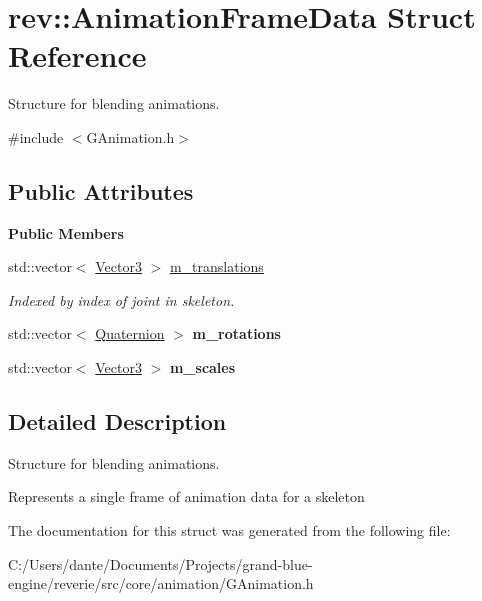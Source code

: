 \hypertarget{structrev_1_1_animation_frame_data}{}\section{rev\+::Animation\+Frame\+Data Struct Reference}
\label{structrev_1_1_animation_frame_data}


Structure for blending animations.  




{\ttfamily \#include $<$G\+Animation.\+h$>$}

\subsection*{Public Attributes}
\begin{Indent}\textbf{ Public Members}\par
\begin{DoxyCompactItemize}
\item 
\mbox{\label{structrev_1_1_animation_frame_data_a192f50d9b1c1ee46f54ec1292f884e09}} 
std\+::vector$<$ \mbox{\hyperlink{classrev_1_1_vector}{Vector3}} $>$ \mbox{\hyperlink{structrev_1_1_animation_frame_data_a192f50d9b1c1ee46f54ec1292f884e09}{m\+\_\+translations}}
\begin{DoxyCompactList}\small\item\em Indexed by index of joint in skeleton. \end{DoxyCompactList}\item 
\mbox{\label{structrev_1_1_animation_frame_data_a53a1913dc0f607f72ab2cda216687c84}} 
std\+::vector$<$ \mbox{\hyperlink{classrev_1_1_quaternion}{Quaternion}} $>$ {\bfseries m\+\_\+rotations}
\item 
\mbox{\label{structrev_1_1_animation_frame_data_ad9e6b0f394cfb52be36db6eebe02acbb}} 
std\+::vector$<$ \mbox{\hyperlink{classrev_1_1_vector}{Vector3}} $>$ {\bfseries m\+\_\+scales}
\end{DoxyCompactItemize}
\end{Indent}


\subsection{Detailed Description}
Structure for blending animations. 

Represents a single frame of animation data for a skeleton 

The documentation for this struct was generated from the following file\+:\begin{DoxyCompactItemize}
\item 
C\+:/\+Users/dante/\+Documents/\+Projects/grand-\/blue-\/engine/reverie/src/core/animation/G\+Animation.\+h\end{DoxyCompactItemize}
